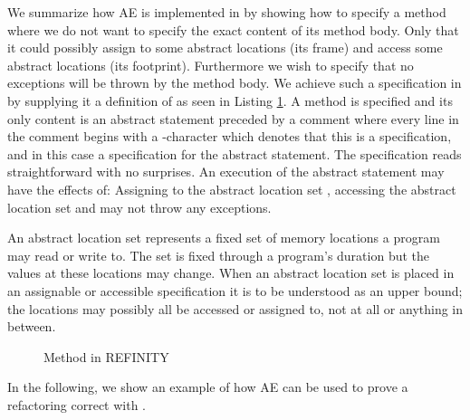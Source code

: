 We summarize how AE is implemented in \Refinity{} by showing how to specify a method  where we do not want to specify the exact content of its method body.
Only that it could possibly assign to some abstract locations (its frame) and access some abstract locations (its footprint).
Furthermore we wish to specify that no exceptions will be thrown by the method body.
We achieve such a specification in \Refinity{} by supplying it a definition of  as seen in Listing \ref{lst:ExtractVariable-refinity-method}.
A method is specified and its only content is an abstract statement  preceded by a comment where every line in the
comment begins with a -character which denotes that this is a specification, and in this case a specification for the abstract statement.
The specification reads straightforward with no surprises. An execution of the abstract statement  may have the effects of: Assigning to the
abstract location set , accessing the abstract location set  and may not throw any exceptions.

An abstract location set represents a fixed set of memory locations a program may read or write to.
The set is fixed through a program's duration but the values at these locations may change.
When an abstract location set is placed in an assignable or accessible specification it is to be understood as an upper bound;
the locations may possibly all be accessed or assigned to, not at all or anything in between.

\begin{figure}[tbp]
  \centering
  \captionsetup{type=lstlisting}
  \begin{sublstlisting}{.65\linewidth}
  
  \end{sublstlisting}
  \caption{Method in REFINITY}
  \label{lst:ExtractVariable-refinity-method}
\end{figure}


In the following, we show an example of how AE can be used to prove a refactoring correct with \Refinity{}. 

